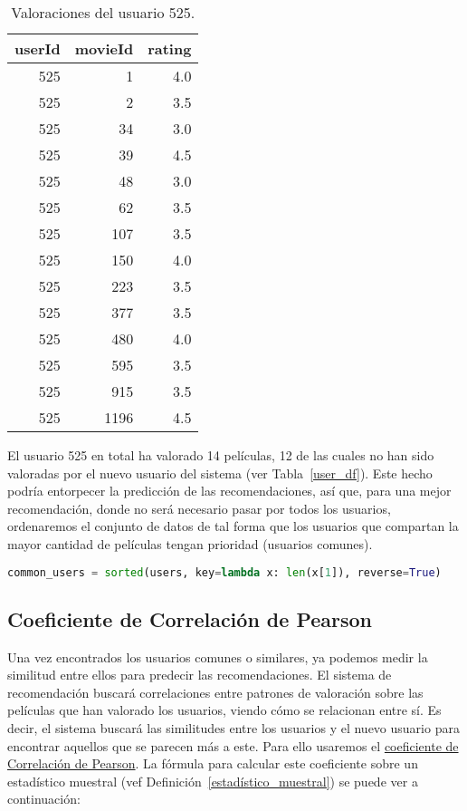 \documentclass{uimppracticas}
\begin{document}
\begin{table}[H]
	\centering
	\begin{tabular}{rrr}
		\toprule
		userId &  movieId &  rating \\
		\midrule
		525 &        1 &     4.0 \\
		525 &        2 &     3.5 \\
		525 &       34 &     3.0 \\
		525 &       39 &     4.5 \\
		525 &       48 &     3.0 \\
		525 &       62 &     3.5 \\
		525 &      107 &     3.5 \\
		525 &      150 &     4.0 \\
		525 &      223 &     3.5 \\
		525 &      377 &     3.5 \\
		525 &      480 &     4.0 \\
		525 &      595 &     3.5 \\
		525 &      915 &     3.5 \\
		525 &     1196 &     4.5 \\
		\bottomrule
	\end{tabular}
	\caption{Valoraciones del usuario 525.}
	\label{user_525}
\end{table}

El usuario 525 en total ha valorado 14 películas, 12 de las cuales no han sido valoradas por el nuevo usuario del sistema (ver Tabla~\ref{user_df}). Este hecho podría entorpecer la predicción de las recomendaciones, así que, para una mejor recomendación, donde no será necesario pasar por todos los usuarios, ordenaremos el conjunto de datos de tal forma que los usuarios que compartan la mayor cantidad de películas tengan prioridad (usuarios comunes).

\begin{lstlisting}[language=python, basicstyle=\small]
common_users = sorted(users, key=lambda x: len(x[1]), reverse=True)
\end{lstlisting}

\subsection{Coeficiente de Correlación de Pearson}\label{correlacion_pearson}

Una vez encontrados los usuarios comunes o similares, ya podemos medir la similitud entre ellos para predecir las recomendaciones. El sistema de recomendación buscará correlaciones entre patrones de valoración sobre las películas que han valorado los usuarios, viendo cómo se relacionan entre sí. Es decir, el sistema buscará las similitudes entre los usuarios y el nuevo usuario para encontrar aquellos que se parecen más a este. Para ello usaremos el \href{https://es.wikipedia.org/wiki/Coeficiente_de_correlaci\%C3\%B3n_de_Pearson}{coeficiente de Correlación de Pearson}. La fórmula para calcular este coeficiente sobre un estadístico muestral (vef Definición~\ref{estadístico_muestral}) se puede ver a continuación:
\end{document}
